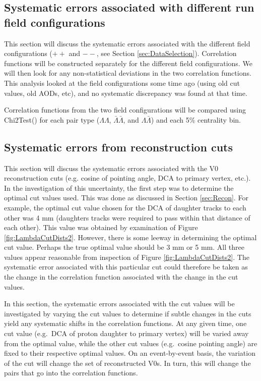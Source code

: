 \subsection{Systematic errors associated with different run field configurations}
\label{sec:SystematicsFieldConfig}



This section will discuss the systematic errors associated with the different field configurations ($++$ and $--$, see Section \ref{sec:DataSelection}).  Correlation functions will be constructed separately for the different field configurations.  We will then look for any non-statistical deviations in the two correlation functions.  This analysis looked at the field configurations some time ago (using old cut values, old AODs, etc), and no systematic discrepancy was found at that time.





Correlation functions from the two field configurations will be compared using Chi2Test() for each pair type ($\Lambda\Lambda$, $\bar{\Lambda}\bar{\Lambda}$, and $\Lambda\bar{\Lambda}$) and each 5\% centrality bin. 

\subsection{Systematic errors from reconstruction cuts}
\label{sec:SystematicsReconstruction}

This section will discuss the systematic errors associated with the V0 reconstruction cuts (e.g. cosine of pointing angle, DCA to primary vertex, etc.).  In the investigation of this uncertainty, the first step was to determine the optimal cut values used.  This was done as discussed in Section \ref{sec:Recon}.  For example, the optimal cut value chosen for the DCA of daughter tracks to each other was 4 mm (daughters tracks were required to pass within that distance of each other).  This value was obtained by examination of Figure \ref{fig:LambdaCutDists2}.  However, there is some leeway in determining the optimal cut value.  Perhaps the true optimal value should be 3 mm or 5 mm.  All three values appear reasonable from inspection of Figure \ref{fig:LambdaCutDists2}.  The systematic error associated with this particular cut could therefore be taken as the change in the correlation function associated with the change in the cut values.

In this section, the systematic errors associated with the cut values will be investigated by varying the cut values to determine if subtle changes in the cuts yield any systematic shifts in the correlation functions.  At any given time, one cut value (e.g.\ DCA of proton daughter to primary vertex) will be varied away from the optimal value, while the other cut values (e.g.\ cosine pointing angle) are fixed to their respective optimal values.  On an event-by-event basis, the variation of the cut will change the set of reconstructed V0s.  In turn, this will change the pairs that go into the correlation functions.  

